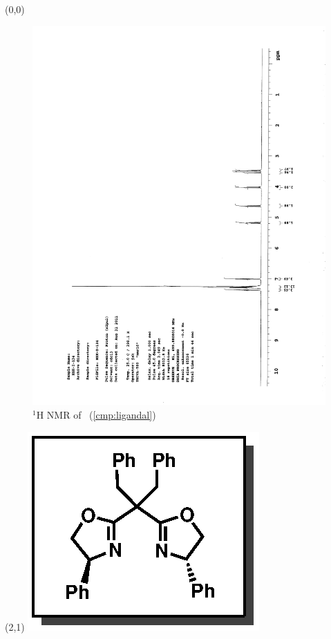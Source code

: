 \begin{textblock}{20}(0,0)
\begin{figure}[htb]
\caption{$^1$H NMR of \CMPligandal\ (\ref{cmp:ligandal})}
\includegraphics[scale=0.75, trim = 0mm 0mm 0mm 5mm,
clip]{chp_asymmetric/images/nmr/ligandalH}
\vspace{-100pt}
\end{figure}
\end{textblock}
\begin{textblock}{1}(2,1)
\includegraphics[scale=0.8, angle=90]{chp_asymmetric/images/ligandal}
\end{textblock}
